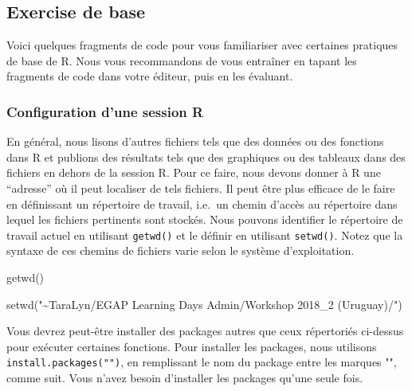 \documentclass[
  12pt,
]{book}
\newenvironment{Shaded}{\begin{snugshade}}{\end{snugshade}}
\newcommand{\FunctionTok}[1]{\textcolor[rgb]{0.00,0.00,0.00}{#1}}
\newcommand{\NormalTok}[1]{#1}
\newcommand{\StringTok}[1]{\textcolor[rgb]{0.31,0.60,0.02}{#1}}
\begin{document}
\hypertarget{exercise-de-base}{%
\subsection{Exercise de base}\label{exercise-de-base}}

Voici quelques fragments de code pour vous familiariser avec certaines pratiques de base de R. Nous vous recommandons de vous entraîner en tapant les fragments de code dans votre éditeur, puis en les évaluant.

\hypertarget{configuration-dune-session-r}{%
\subsubsection{Configuration d'une session R}\label{configuration-dune-session-r}}

En général, nous lisons d'autres fichiers tels que des données ou des fonctions dans R et publions des résultats tels que des graphiques ou des tableaux dans des fichiers en dehors de la session R. Pour ce faire, nous devons donner à R une ``adresse'' où il peut localiser de tels fichiers. Il peut être plus efficace de le faire en définissant un répertoire de travail, i.e.~un chemin d'accès au répertoire dans lequel les fichiers pertinents sont stockés. Nous pouvons identifier le répertoire de travail actuel en utilisant \texttt{getwd()} et le définir en utilisant \texttt{setwd()}. Notez que la syntaxe de ces chemins de fichiers varie selon le système d'exploitation.

\begin{Shaded}
\begin{Highlighting}[]
\FunctionTok{getwd}\NormalTok{()}
\end{Highlighting}
\end{Shaded}

\begin{Shaded}
\begin{Highlighting}[]
\FunctionTok{setwd}\NormalTok{(}\StringTok{"\textasciitilde{}TaraLyn/EGAP Learning Days Admin/Workshop 2018\_2 (Uruguay)/"}\NormalTok{)}
\end{Highlighting}
\end{Shaded}

Vous devrez peut-être installer des packages autres que ceux répertoriés ci-dessus pour exécuter certaines fonctions. Pour installer les packages, nous utilisons \texttt{install.packages("")}, en remplissant le nom du package entre les marques "", comme suit. Vous n'avez besoin d'installer les packages qu'une seule fois.
\end{document}
